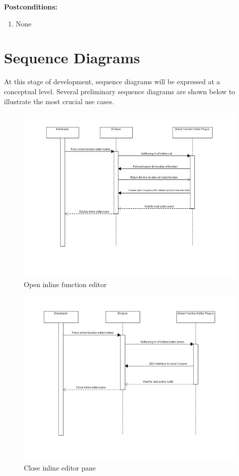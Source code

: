 \documentclass[]{report}
\begin{document}
		\noindent\textbf{Postconditions:}
		
		\begin{enumerate}
			
			\item 
			None
			
		\end{enumerate}

\chapter{Sequence Diagrams}

	At this stage of development, sequence diagrams will be expressed at a conceptual level.  Several preliminary sequence diagrams are shown below to illustrate the most crucial use cases.
	
	\begin{figure}[h!]
		\includegraphics[width=\linewidth]{imgs/open_editor.png}
		\caption{Open inline function editor}
	\end{figure}
	
	\begin{figure}[h]
		\includegraphics[width=\linewidth]{imgs/close_editor.png}
		\caption{Close inline editor pane}
	\end{figure}
\end{document}
